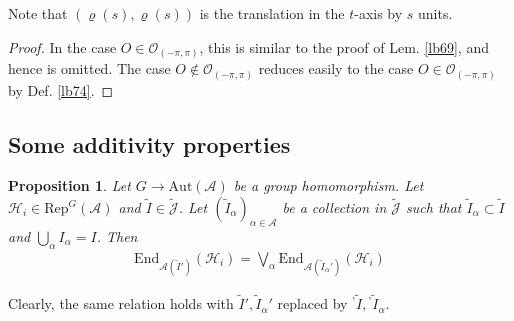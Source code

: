 \documentclass[11pt,b5paper,notitlepage]{article}
\theoremstyle{definition}
\theoremstyle{plain}
\newtheorem{pp}[df]{Proposition}
\newcommand{\wtd}{\widetilde}
\newcommand{\End}{\mathrm{End}} %
\newcommand{\RepGA}{\mathrm{Rep}^G(\mathcal A)}
\newcommand{\scr}{\mathscr}
\newcommand{\Jtd}{\widetilde{\mathcal J}}
\newcommand{\bpr}{{}^\backprime}
\newcommand{\Aut}{\mathrm{Aut}}
\newcommand{\MA}{\mathcal A}
\newcommand{\MH}{\mathcal H}
\newcommand{\Opp}{\mathcal O_{(-\pi,\pi)}}
\numberwithin{equation}{section}
\begin{document}
Note that $(\varrho(s),\varrho(s))$ is the translation in the $t$-axis by $s$ units. 


\begin{proof}
In the case $O\in\Opp$, this is similar to the proof of Lem. \ref{lb69}, and hence is omitted. The case $O\notin\Opp$ reduces easily to the case $O\in\Opp$ by Def. \ref{lb74}. 
\end{proof}






\subsection{Some additivity properties}


\begin{pp}\label{lb62}
Let $G\rightarrow\Aut(\MA)$ be a group homomorphism. Let $\MH_i\in\RepGA$ and $\wtd I\in\Jtd$. Let $(\wtd I_\alpha)_{\alpha\in\scr A}$ be a collection in $\Jtd$ such that $\wtd I_\alpha\subset\wtd I$ and $\bigcup_\alpha I_\alpha=I$. Then
\begin{align*}
\End_{\MA(\wtd I')}(\MH_i)=\bigvee_\alpha \End_{\MA(\wtd I_\alpha')}(\MH_i) 
\end{align*}
\end{pp}


Clearly, the same relation holds with $\wtd I',\wtd I_\alpha'$ replaced by $\bpr\wtd I,\bpr\wtd I_\alpha$.
\end{document}
